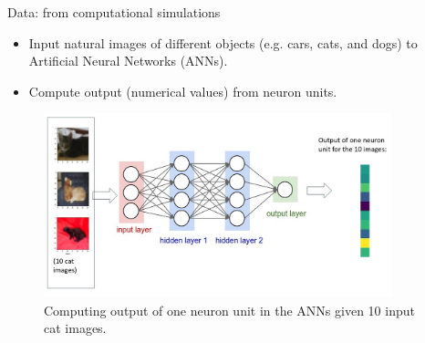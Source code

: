 \documentclass[xcolor={dvipsnames,svgnames}]{beamer}
\begin{document}
\begin{frame}{Data: from computational simulations}
    \begin{itemize}
        \item Input natural images of different objects (e.g. cars, cats, and dogs) to Artificial Neural Networks (ANNs).
        \item Compute output (numerical values) from neuron units.
    \end{itemize}
    \begin{figure}
        \centering
            \includegraphics[width=0.9\textwidth]{Slide1.jpg}
            \caption{Computing output of one neuron unit in the ANNs given 10 input cat images.}
    \end{figure}
\end{frame}


        
        
        
        
        
\end{document}
